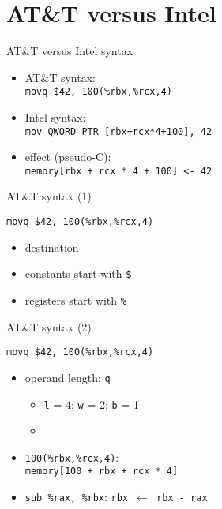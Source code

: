
\section{AT\&T versus Intel}

\begin{frame}{AT\&T versus Intel syntax}
    \begin{itemize}
    \item AT\&T syntax: \\ {\tt movq \$42, 100(\%rbx,\%rcx,4)}
    \item Intel syntax: \\ {\tt mov QWORD PTR [rbx+rcx*4+100], 42}
    \item effect (pseudo-C): \\ {\tt memory[rbx + rcx * 4 + 100] <- 42}
    \end{itemize}
\end{frame}

\begin{frame}[fragile,label=att1]{AT\&T syntax (1)}
\begin{lstlisting}
movq $42, 100(%rbx,%rcx,4)
\end{lstlisting}
    \begin{itemize}
    \item destination 
    \item constants start with {\tt \$}
    \item registers start with {\tt \%}
    \end{itemize}
\end{frame}

\begin{frame}[fragile,label=att2]{AT\&T syntax (2)}
\begin{lstlisting}
movq $42, 100(%rbx,%rcx,4)
\end{lstlisting}
    \begin{itemize}
    \item operand length: {\tt q}
        \begin{itemize}
        \item {\tt l} = 4; {\tt w} = 2; {\tt b} = 1
        \item 
        \end{itemize}
    \item {\tt 100(\%rbx,\%rcx,4)}: \\ {\tt memory[100 + rbx + rcx * 4]}
    \item {\tt sub \%rax, \%rbx}: {\tt rbx $\leftarrow$ rbx - rax}
    \end{itemize}
\end{frame}

